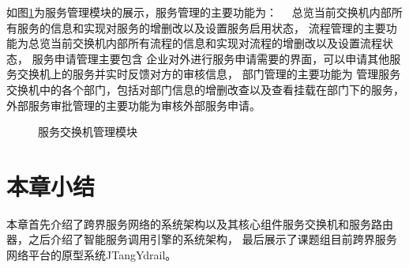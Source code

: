 如图\ref{fig:fuwuguanli}为服务管理模块的展示，服务管理的主要功能为：　
总览当前交换机内部所有服务的信息和实现对服务的增删改以及设置服务启用状态，
流程管理的主要功能为总览当前交换机内部所有流程的信息和实现对流程的增删改以及设置流程状态，
服务申请管理主要包含
企业对外进行服务申请需要的界面，可以申请其他服务交换机上的服务并实时反馈对方的审核信息，
部门管理的主要功能为
管理服务交换机中的各个部门，包括对部门信息的增删改查以及查看挂载在部门下的服务，
外部服务审批管理的主要功能为审核外部服务申请。
\begin{figure}[htbp]
  \caption{服务交换机管理模块}
  \label{fig:fuwuguanli}
  \end{figure}

\section{本章小结}
本章首先介绍了跨界服务网络的系统架构以及其核心组件服务交换机和服务路由器，之后介绍了智能服务调用引擎的系统架构，
最后展示了课题组目前跨界服务网络平台的原型系统JTangYdrail。
